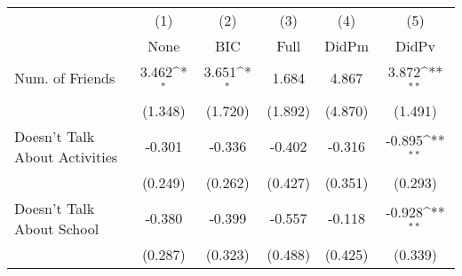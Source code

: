 {
\def\sym#1{\ifmmode^{#1}\else\(^{#1}\)\fi}
\begin{tabular}{l*{5}{c}}
\toprule
            &\multicolumn{1}{c}{(1)}&\multicolumn{1}{c}{(2)}&\multicolumn{1}{c}{(3)}&\multicolumn{1}{c}{(4)}&\multicolumn{1}{c}{(5)}\\
            &\multicolumn{1}{c}{None}&\multicolumn{1}{c}{BIC}&\multicolumn{1}{c}{Full}&\multicolumn{1}{c}{DidPm}&\multicolumn{1}{c}{DidPv}\\
\midrule
Num. of Friends&       3.462\sym{*}  &       3.651\sym{*}  &       1.684         &       4.867         &       3.872\sym{**} \\
            &     (1.348)         &     (1.720)         &     (1.892)         &     (4.870)         &     (1.491)         \\
\addlinespace
Doesn't Talk About Activities&      -0.301         &      -0.336         &      -0.402         &      -0.316         &      -0.895\sym{**} \\
            &     (0.249)         &     (0.262)         &     (0.427)         &     (0.351)         &     (0.293)         \\
\addlinespace
Doesn't Talk About School&      -0.380         &      -0.399         &      -0.557         &      -0.118         &      -0.928\sym{**} \\
            &     (0.287)         &     (0.323)         &     (0.488)         &     (0.425)         &     (0.339)         \\
\bottomrule
\end{tabular}
}
